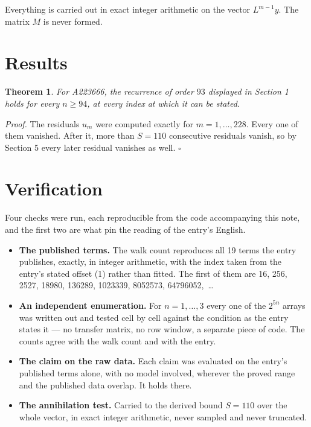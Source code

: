 \documentclass[11pt]{article}
\newtheorem{theorem}{Theorem}
\theoremstyle{definition}
\begin{document}
Everything is carried out in exact integer arithmetic on the vector $L^{m-1}y$. The matrix $M$ is never formed.

\section{Results}

\begin{theorem} For A223666, the recurrence of order $93$ displayed in Section 1 holds for every $n \ge 94$, at every index at which it can be stated.\end{theorem}

{\itshape Proof.} The residuals $u_m$ were computed exactly for $m = 1,\dots,228$. Every one of them vanished. After it, more than $S = 110$ consecutive residuals vanish, so by Section 5 every later residual vanishes as well. $\square$

\section{Verification}

Four checks were run, each reproducible from the code accompanying this note, and the first two are what pin the reading of the entry's English.

\begin{itemize}

\item {\bfseries The published terms.} The walk count reproduces all 19 terms the entry publishes, exactly, in integer arithmetic, with the index taken from the entry's stated offset (1) rather than fitted. The first of them are 16, 256, 2527, 18980, 136289, 1023339, 8052573, 64796052,~\dots

\item {\bfseries An independent enumeration.} For $n = 1,\dots,3$ every one of the $2^{5n}$ arrays was written out and tested cell by cell against the condition as the entry states it --- no transfer matrix, no row window, a separate piece of code. The counts agree with the walk count and with the entry.

\item {\bfseries The claim on the raw data.} Each claim was evaluated on the entry's published terms alone, with no model involved, wherever the proved range and the published data overlap. It holds there.

\item {\bfseries The annihilation test.} Carried to the derived bound $S = 110$ over the whole vector, in exact integer arithmetic, never sampled and never truncated.

\end{itemize}
\end{document}
